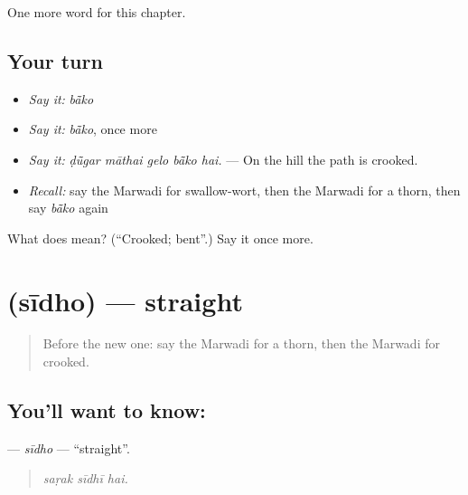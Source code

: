 \begin{grammarlens}[title={What you've built}]
One more word for this chapter.
\end{grammarlens}

\subsection*{Your turn}
\begin{itemize}
\raggedright
  \item \emph{Say it:} \emph{bā̃ko}
  \item \emph{Say it:} \emph{bā̃ko}, once more
  \item \emph{Say it:} \emph{ḍū̃gar māthai gelo bā̃ko hai.} — On the hill the path is crooked.
  \item \emph{Recall:} say the Marwadi for swallow-wort, then the Marwadi for a thorn, then say \emph{bā̃ko} again
\end{itemize}

\begin{tcolorbox}[breakable,colback=teal!4,colframe=teal!35!black,title={Before you move on}]
What does  mean? (\textquotedblleft{}Crooked; bent\textquotedblright{}.) Say it once more.
\end{tcolorbox}
\section[\texorpdfstring{\mw{सीधो} (sīdho)}{सीधो (sīdho)}]{ (sīdho) — straight}

\label{lesson:MW-C231-sidho}



\begin{quote}
Before the new one: say the Marwadi for a thorn, then the Marwadi for crooked.
\end{quote}

\subsection*{You'll want to know: }
\textbf{} — \emph{sīdho} — \textquotedblleft{}straight\textquotedblright{}.

\begin{quote}
  
\end{quote}

\begin{quote}
\emph{saṛak sīdhī hai.}
\end{quote}

